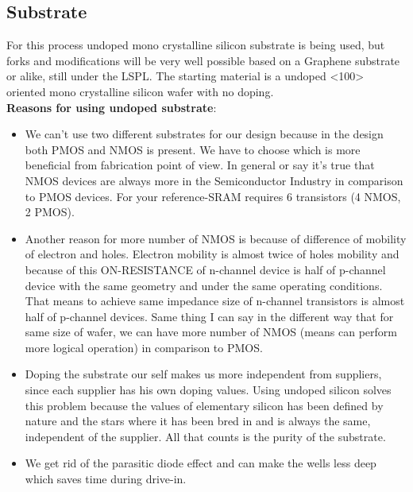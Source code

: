 \subsection{Substrate}
For this process undoped mono crystalline silicon substrate is being used, but forks and modifications will be very well possible based on a Graphene substrate or alike, still under the LSPL.
The starting material is a undoped <100> oriented mono crystalline silicon wafer with no doping.\\

\textbf{Reasons for using undoped substrate}:\begin{itemize}
\item We can't use two different substrates for our design because in the design both PMOS and NMOS is present.
We have to choose which is more beneficial from fabrication point of view.
In general or say it's true that NMOS devices are always more in the Semiconductor Industry in comparison to PMOS devices.
For your reference-SRAM requires 6 transistors (4 NMOS, 2 PMOS).
\item Another reason for more number of NMOS is because of difference of mobility of electron and holes.
Electron mobility is almost twice of holes mobility and because of this ON-RESISTANCE of n-channel device is half of p-channel device with the same geometry and under the same operating conditions.
That means to achieve same impedance size of n-channel transistors is almost half of p-channel devices.
Same thing I can say in the different way that for same size of wafer, we can have more number of NMOS (means can perform more logical operation) in comparison to PMOS.
\item Doping the substrate our self makes us more independent from suppliers, since each supplier has his own doping values. Using undoped silicon solves this problem because the values of elementary silicon has been defined by nature and the stars where it has been bred in and is always the same, independent of the supplier. All that counts is the purity of the substrate.
\item We get rid of the parasitic diode effect and can make the wells less deep which saves time during drive-in.
\end{itemize}